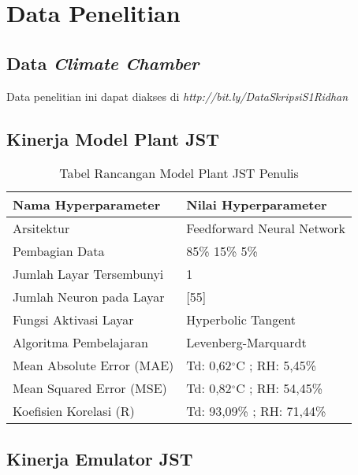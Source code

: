 \chapter{Data Penelitian}

\section{Data \textit{Climate Chamber}}
Data penelitian ini dapat diakses di \textit{http://bit.ly/DataSkripsiS1Ridhan}

\section{Kinerja Model Plant JST}

\begin{table}[!h]
	\caption{Tabel Rancangan Model Plant JST Penulis}
	\label{tbl:A:NNPlantRidhan}
	\centering
	\begin{tabular}{|p{5.7cm}|p{5cm}|}
		\hline
		\textbf{Nama Hyperparameter} & \textbf{Nilai Hyperparameter} \\ \hline
		Arsitektur & Feedforward Neural Network \\ \hline
		Pembagian Data & 85\% 15\% 5\% \\ \hline 
		Jumlah Layar Tersembunyi & 1 \\ \hline
		Jumlah Neuron pada Layar & [55] \\ \hline
		Fungsi Aktivasi Layar & Hyperbolic Tangent \\ \hline
		Algoritma Pembelajaran & Levenberg-Marquardt \\ \hline
		Mean Absolute Error (MAE) & Td: 0,62$^\circ$C ; RH: 5,45\% \\ \hline
		Mean Squared Error (MSE) & Td: 0,82$^\circ$C ; RH: 54,45\% \\ \hline
		Koefisien Korelasi (R) & Td: 93,09\% ; RH: 71,44\% \\ \hline
	\end{tabular}
\end{table}
\vspace{-1em}

\section{Kinerja Emulator JST}

